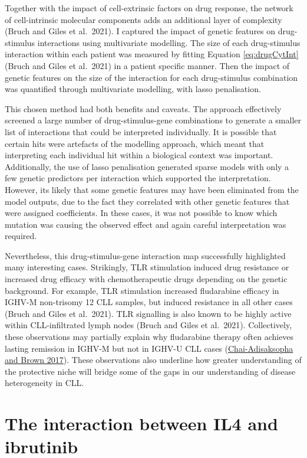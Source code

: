 \documentclass[11pt, a4paper, twosided]{book}
\begin{document}
Together with the impact of cell-extrinsic factors on drug response, the network of cell-intrinsic molecular components adds an additional layer of complexity (Bruch and Giles et al.~2021). I captured the impact of genetic features on drug-stimulus interactions using multivariate modelling. The size of each drug-stimulus interaction within each patient was measured by fitting Equation \eqref{eq:drugCytInt} (Bruch and Giles et al.~2021) in a patient specific manner. Then the impact of genetic features on the size of the interaction for each drug-stimulus combination was quantified through multivariate modelling, with lasso penalisation.

This chosen method had both benefits and caveats. The approach effectively screened a large number of drug-stimulus-gene combinations to generate a smaller list of interactions that could be interpreted individually. It is possible that certain hits were artefacts of the modelling approach, which meant that interpreting each individual hit within a biological context was important. Additionally, the use of lasso penalisation generated sparse models with only a few genetic predictors per interaction which supported the interpretation. However, its likely that some genetic features may have been eliminated from the model outputs, due to the fact they correlated with other genetic features that were assigned coefficients. In these cases, it was not possible to know which mutation was causing the observed effect and again careful interpretation was required.

Nevertheless, this drug-stimulus-gene interaction map successfully highlighted many interesting cases. Strikingly, TLR stimulation induced drug resistance or increased drug efficacy with chemotherapeutic drugs depending on the genetic background. For example, TLR stimulation increased fludarabine efficacy in IGHV-M non-trisomy 12 CLL samples, but induced resistance in all other cases (Bruch and Giles et al.~2021). TLR signalling is also known to be highly active within CLL-infiltrated lymph nodes (Bruch and Giles et al.~2021). Collectively, these observations may partially explain why fludarabine therapy often achieves lasting remission in IGHV-M but not in IGHV-U CLL cases (\protect\hyperlink{ref-Chai2017}{Chai-Adisaksopha and Brown 2017}). These observations also underline how greater understanding of the protective niche will bridge some of the gaps in our understanding of disease heterogeneity in CLL.

\hypertarget{discussion-IL4-ibrutinib}{%
\section{The interaction between IL4 and ibrutinib}\label{discussion-IL4-ibrutinib}}
\end{document}
